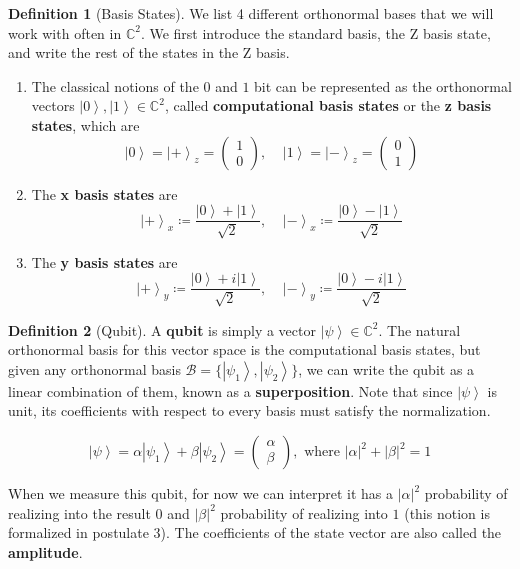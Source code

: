 \documentclass{article}
\newcommand{\ket}[1]{\ensuremath{\left|#1\right\rangle}}
\theoremstyle{definition}
\newtheorem{definition}{Definition}[section]
\begin{document}
    \begin{definition}[Basis States]
      We list 4 different orthonormal bases that we will work with often in $\mathbb{C}^2$. We first introduce the standard basis, the Z basis state, and write the rest of the states in the Z basis. 

      \begin{enumerate}
        \item The classical notions of the $0$ and $1$ bit can be represented as the orthonormal vectors $\ket{0}, \ket{1} \in \mathbb{C}^2$, called \textbf{computational basis states} or the \textbf{z basis states}, which are
          \[\ket{0} = \ket{+}_z = \begin{pmatrix} 1 \\ 0 \end{pmatrix}, \;\;\;\; \ket{1} = \ket{-}_z = \begin{pmatrix} 0 \\ 1 \end{pmatrix}\]  

        \item The \textbf{x basis states} are 
          \begin{equation}
            \ket{+}_x \coloneqq \frac{\ket{0} + \ket{1}}{\sqrt{2}} , \;\;\;\; \ket{-}_x \coloneqq \frac{\ket{0} - \ket{1}}{\sqrt{2}} 
            \label{eq:x_basis}
          \end{equation}
        
        \item The \textbf{y basis states} are 
          \begin{equation}
            \ket{+}_y \coloneqq \frac{\ket{0} + i \ket{1}}{\sqrt{2}} , \;\;\;\; \ket{-}_y \coloneqq \frac{\ket{0} - i \ket{1}}{\sqrt{2}} 
            \label{eq:y_basis}
          \end{equation}
      \end{enumerate}

      
    \end{definition}

    \begin{definition}[Qubit]
      A \textbf{qubit} is simply a vector $\ket{\psi} \in \mathbb{C}^2$. The natural orthonormal basis for this vector space is the computational basis states, but given any orthonormal basis $\mathcal{B} = \{\ket{\psi_1} , \ket{\psi_2}\}$, we can write the qubit as a linear combination of them, known as a \textbf{superposition}. Note that since $\ket{\psi}$ is unit, its coefficients with respect to every basis must satisfy the normalization.  

        \[\ket{\psi} = \alpha \ket{\psi_1} + \beta \ket{\psi_2} = \begin{pmatrix} \alpha \\ \beta \end{pmatrix}, \text{ where } |\alpha|^2 + |\beta|^2 = 1\]

      When we measure this qubit, for now we can interpret it has a $|\alpha|^2$ probability of realizing into the result $0$ and $|\beta|^2$ probability of realizing into $1$ (this notion is formalized in postulate 3). The coefficients of the state vector are also called the \textbf{amplitude}. 
    \end{definition} 
\end{document}
